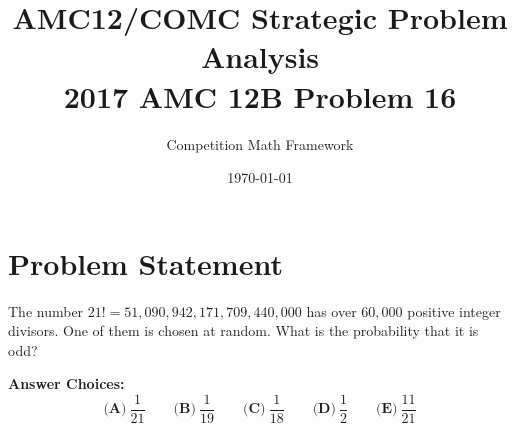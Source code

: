 \documentclass[]{article}
\begin{document}
\title{\textbf{AMC12/COMC Strategic Problem Analysis\\2017 AMC 12B Problem 16}}
\author{Competition Math Framework}
\date{\today}
\maketitle

\section*{Problem Statement}
The number $21! = 51,090,942,171,709,440,000$ has over $60,000$ positive integer divisors. One of them is chosen at random. What is the probability that it is odd?

\textbf{Answer Choices:}
\[\textbf{(A)}\ \frac{1}{21} \qquad \textbf{(B)}\ \frac{1}{19} \qquad \textbf{(C)}\ \frac{1}{18} \qquad \textbf{(D)}\ \frac{1}{2} \qquad \textbf{(E)}\ \frac{11}{21}\]
\end{document}
